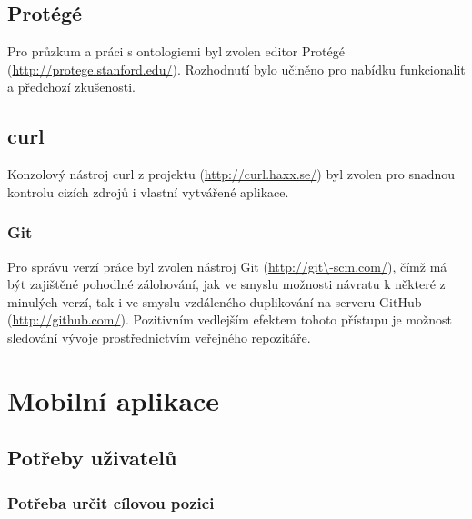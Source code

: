 \subsection{Protégé}
Pro průzkum a práci s ontologiemi byl zvolen editor Protégé (\url{http://protege.stanford.edu/}). Rozhodnutí bylo učiněno pro nabídku funkcionalit a předchozí zkušenosti.

\subsection{curl}
Konzolový nástroj curl z projektu  (\url{http://curl.haxx.se/}) byl zvolen pro snadnou kontrolu cizích zdrojů i vlastní vytvářené aplikace.

\subsubsection{Git}
Pro správu verzí práce byl zvolen nástroj Git (\url{http://git\-scm.com/}), čímž má být zajištěné pohodlné zálohování, jak ve smyslu možnosti návratu k některé z minulých verzí, tak i ve smyslu vzdáleného duplikování na serveru GitHub (\url{http://github.com/}). Pozitivním vedlejším efektem tohoto přístupu je možnost sledování vývoje prostřednictvím veřejného repozitáře.


\section{Mobilní aplikace}
\subsection{Potřeby uživatelů}
\subsubsection{Potřeba určit cílovou pozici}
